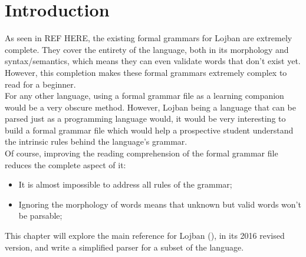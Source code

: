 \chapter{Introduction}

As seen in REF HERE, the existing formal grammars for Lojban are extremely complete. They cover the entirety of the language, both in its morphology and syntax/semantics, which means they can even validate words that don't exist yet. However, this completion makes these formal grammars extremely complex to read for a beginner. \\

For any other language, using a formal grammar file as a learning companion would be a very obscure method. However, Lojban being a language that can be parsed just as a programming language would, it would be very interesting to build a formal grammar file which would help a prospective student understand the intrinsic rules behind the language's grammar. \\

Of course, improving the reading comprehension of the formal grammar file reduces the complete aspect of it:

\begin{itemize}
  \item It is almost impossible to address all rules of the grammar;
  \item Ignoring the morphology of words means that unknown but valid words won't be parsable;
\end{itemize}

This chapter will explore the main reference for Lojban (\cite{cowan1997complete}), in its 2016 revised version, and write a simplified parser for a subset of the language.